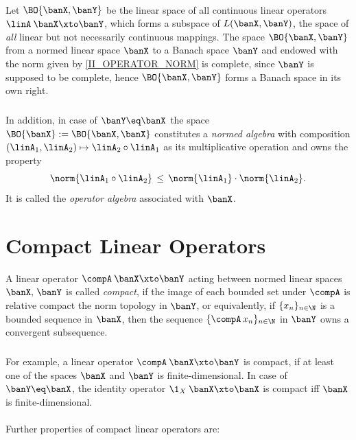 \documentclass[11pt,twoside]{article}
\begin{document}
\paragraph{} %
Let $\BO{\banX,\banY}$ be the linear space
of all continuous linear operators $\linA\:\banX \xto \banY$,
which forms a subspace of $L(\banX,\banY)$,
the space of \textit{all} linear but not necessarily continuous mappings.
The space $\BO{\banX,\banY}$ from a normed linear space $\banX$
to a Banach space $\banY$
and endowed with the norm given by \eqref{II_OPERATOR_NORM} is complete,
since $\banY$ is supposed to be complete,
hence $\BO{\banX,\banY}$ forms a Banach space in its own right.

\subparagraph{}
In addition,
in case of $\banY \eq \banX$
the space $\BO{\banX} := \BO{\banX,\banX}$
constitutes a \textit{normed algebra}
with composition $(\linA_1,\linA_2) \mapsto \linA_2 \circ \linA_1$
as its multiplicative operation
and owns the property
\[
\norm{\linA_1 \circ \linA_2} \, \leq \, \norm{\linA_1} \cdot \norm{\linA_2}.
\]
It is called the \textit{operator algebra}
associated with $\banX$.

\section{Compact Linear Operators}
A linear operator $\compA \: \banX \xto \banY$
acting between normed linear spaces $\banX,\,\banY$
is called \textit{compact},
if the image of each bounded set under $\compA$ is relative compact
{\wrt} the norm topology in $\banY$,
or equivalently,
if $\{x_n\}_{n \in \N}$ is a bounded sequence in $\banX$,
then the sequence $\{\compA \, x_n\}_{n \in \N}$ in $\banY$
owns a convergent subsequence.

\subparagraph{}
For example,
a linear operator $\compA \: \banX \xto \banY$ is compact,
if at least one of the spaces $\banX$ and $\banY$ is finite-dimensional.
In case of $\banY \eq \banX$,
the identity operator $\1_X\:\banX \xto \banX$ is compact
iff $\banX$ is finite-dimensional.

\paragraph{} %
Further properties of compact linear operators are:
\end{document}

